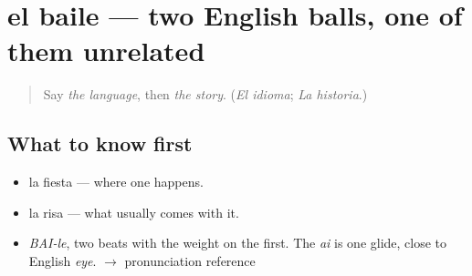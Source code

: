 \section[el baile]{el baile — two English balls, one of them unrelated}

\label{lesson:ES-C377-baile}



\begin{quote}
Say \emph{the language}, then \emph{the story}. (\emph{El idioma}; \emph{La historia}.)
\end{quote}

\subsection*{What to know first}
\begin{itemize}
\raggedright
  \item la fiesta — where one happens.
  \item la risa — what usually comes with it.
\end{itemize}

\begin{sounds}
\begin{itemize}
\raggedright
  \item \emph{BAI-le}, two beats with the weight on the first. The \emph{ai} is one glide, close to English \emph{eye}. $\to$ pronunciation reference
\end{itemize}
\end{sounds}

